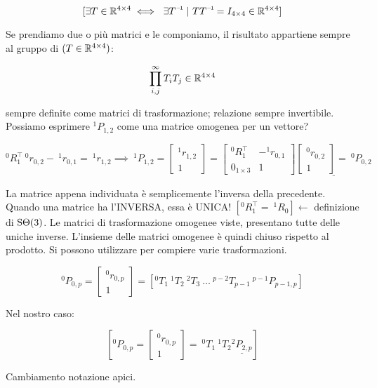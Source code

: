 \[
	[\exists T\in\R^{4\times 4} \iff \ \exists \inv{T}\ |\ T\inv{T} = I_{4\times 4}\in\R^{4\times 4}]
\]

Se prendiamo due o più matrici e le componiamo, il risultato appartiene sempre al gruppo di $(T\in\mathbb{R}^{4\times 4})$:

\[
	\prod_{i,j}^\infty{T_iT_j}\in\mathbb{R}^{4\times 4}
\]

sempre definite come matrici di trasformazione; relazione sempre invertibile. Possiamo esprimere $^1P_{1,2}$ come una matrice omogenea per un vettore?

\[
	^0R_1^\top\ ^0r_{0,2} -\ ^1r_{0,1} =\ ^1r_{1,2} \implies\ ^1P_{1,2}=\begin{bmatrix}^1r_{1,2}\\1\end{bmatrix} = \begin{bmatrix}^0R_1^\top&-^1r_{0,1}\\0_{1\times 3}&1\end{bmatrix}\underline{\begin{bmatrix}^0r_{0,2}\\1\end{bmatrix}=\ ^0P_{0,2}}
\]

La matrice appena individuata è semplicemente l'inversa della precedente. Quando una matrice ha l'INVERSA, essa è UNICA! $[^0R_1^\top =\ ^1R_0] \leftarrow$ definizione di $\operatorname{S\Theta}(3)$. Le matrici di trasformazione omogenee viste, presentano tutte delle uniche inverse. L'insieme delle matrici omogenee è quindi chiuso rispetto al prodotto. Si possono utilizzare per compiere varie trasformazioni.

\[
	^0P_{0,p} = \begin{bmatrix}^0r_{0,p}\\1\end{bmatrix}=[^0T_1\ ^1T_2\ ^2T_3\ \dots\ ^{p-2}T_{p-1}\ ^{p-1}P_{p-1,p}]
\]

Nel nostro caso:

\[	
	[^0P_{0,p} = \begin{bmatrix}^0r_{0,p}\\1\end{bmatrix} =\ ^0T_1\ ^1T_2\underline{^2P_{2,p}}]
\]

Cambiamento notazione apici. 

